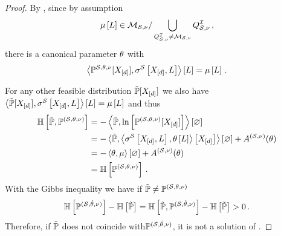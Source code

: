\begin{proof}
    By , since by assumption
    \begin{align*}
        \mu\left[L\right] \in \mathcal{M}_{\mathcal{S},\nu} / \bigcup_{Q^{\mathcal{I}}_{\mathcal{S},\nu}\neq\mathcal{M}_{\mathcal{S},\nu}} Q^{\mathcal{I}}_{\mathcal{S},\nu} \, ,
    \end{align*}
    there is a canonical parameter $\theta$ with
    \begin{align*}
        \left\langle \mathbb{P}^{\mathcal{S},\theta,\nu}[X_{[d]}],\sigma^{\mathcal{S}}\left[X_{[d]},L\right]\right\rangle \left[ L \right]=\mu\left[L\right] \, .
    \end{align*}

    For any other feasible distribution $\tilde{\mathbb{P}}[X_{[d]}]$ we also have $\left\langle \tilde{\mathbb{P}}[X_{[d]}],\sigma^{\mathcal{S}}\left[X_{[d]},L\right]\right\rangle \left[ L \right]=\mu\left[L\right]$ and thus
    \begin{align*}
        \mathbb{H}\left[\tilde{\mathbb{P}},\mathbb{P}^{(\mathcal{S},\theta,\nu)}\right]
        &= -\left\langle \tilde{\mathbb{P}},\ln \left[ \mathbb{P}^{(\mathcal{S},\theta,\nu)}[X_{[d]}] \right]\right\rangle \left[ \varnothing \right] \\
        &= -\left\langle \tilde{\mathbb{P}},\left\langle \sigma^{\mathcal{S}}\left[X_{[d]},L\right],\theta\left[L\right]\right\rangle \left[ X_{[d]} \right]\right\rangle \left[ \varnothing \right] + A^{(\mathcal{S},\nu)}(\theta) \\
        &= - \left\langle \theta,\mu\right\rangle \left[ \varnothing \right] + A^{(\mathcal{S},\nu)}(\theta) \\
        &= \mathbb{H}\left[\mathbb{P}^{(\mathcal{S},\theta,\nu)}\right] \, .
    \end{align*}
    With the Gibbs inequality we have if $\tilde{\mathbb{P}}\neq\mathbb{P}^{(\mathcal{S},\theta,\nu)}$
    \begin{align*}
        \mathbb{H}\left[\mathbb{P}^{(\mathcal{S},\hat{\theta},\nu)}\right] - \mathbb{H}\left[\tilde{\mathbb{P}}\right]
        = \mathbb{H}\left[\tilde{\mathbb{P}},\mathbb{P}^{(\mathcal{S},\hat{\theta},\nu)}\right] - \mathbb{H}\left[\tilde{\mathbb{P}}\right] > 0 \, .
    \end{align*}
    Therefore, if $\tilde{\mathbb{P}}$ does not coincide with$\mathbb{P}^{(\mathcal{S},\hat{\theta},\nu)}$, it is not a solution of .
\end{proof}


